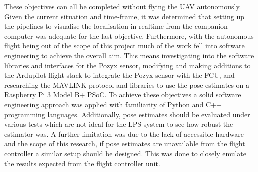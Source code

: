 These objectives can all be completed without flying the UAV autonomously.
Given the current situation and time-frame, it was determined that setting up the pipelines to visualise the localisation in realtime from the companion computer was adequate for the last objective.
Furthermore, with the autonomous flight being out of the scope of this project much of the work fell into software engineering to achieve the overall aim.
This means investigating into the software libraries and interfaces for the Pozyx sensor, modifying and making additions to the Ardupilot flight stack to integrate the Pozyx sensor with the FCU,
and researching the MAVLINK protocol and libraries to use the pose estimates on a Raspberry Pi 3 Model B+ PSoC.
To achieve these objectives a solid software engineering approach was applied with familiarity of Python and C++ programming languages.
Additionally, pose estimates should be evaluated under various tests which are not ideal for the LPS system to see how robust the estimator was.
A further limitation was due to the lack of accessible hardware and the scope of this research, if pose estimates are unavailable from the flight controller a similar setup should be designed.
This was done to closely emulate the results expected from the flight controller unit.

